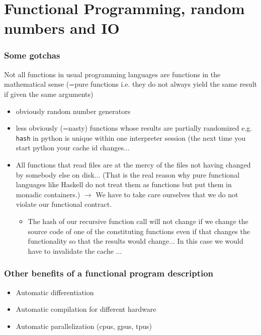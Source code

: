 \documentclass[t]{beamer}
\begin{document}
\section{Functional Programming, random numbers and IO}
\begin{frame}
\frametitle{Some gotchas} 
  Not all functions in usual programming languages are functions in the mathematical sense (=\alert{pure} functions i.e. they do not always yield the same result if given the same arguments)
  \begin{itemize}
  \item obviously random number generators
  \item less obviously (=nasty) functions whose results are \alert{partially} randomized 
  e.g. \texttt{hash} in python is unique within one interpreter session (the next time you start python your cache id changes... 
  \item All functions that read files are at the mercy of the files not having changed by somebody else on disk...
  (That is the real reason why \alert{pure} functional languages like Haskell do not treat them as functions but put them in monadic containers.)
  $\rightarrow$ We have to take care ourselves that we do not violate our functional contract.
  \begin{itemize}
    \item The hash of our recursive function call will not change if we change the source code of one of the constituting functions even if that changes the functionality so that the results would change... In this case we would have to invalidate the cache ...
  \end{itemize}
  
  \end{itemize}
\end{frame}

\begin{frame}
\frametitle{Other benefits of a functional program description}

  \begin{itemize}
    \item Automatic differentiation
    \item Automatic compilation for different hardware 
    \item Automatic parallelization (cpus, gpus, tpus)
  \end{itemize}
\end{frame}
\end{document}
